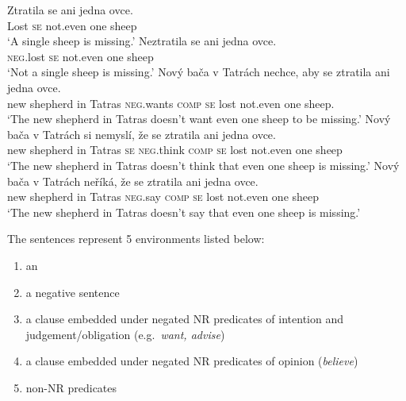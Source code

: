 \documentclass[output=paper, colorlinks, citecolor=brown, newtxmath]{langsci/langscibook}
\begin{document}
\ea \label{ex-24} \ea \gll Ztratila se ani jedna ovce.\\
Lost \textsc{se} not.even one sheep\\
\glt `A single sheep is missing.'
\ex \gll Neztratila se ani jedna ovce.\label{ex-24-b}\\
\textsc{neg}.lost \textsc{se} not.even one sheep\\
\glt `Not a single sheep is missing.'
\ex \gll Nový bača v Tatrách nechce, aby se ztratila ani jedna ovce.\\
new shepherd in Tatras \textsc{neg}.wants \textsc{comp} \textsc{se} lost not.even one sheep.\\
\glt `The new shepherd in Tatras doesn't want even one sheep to be missing.'
\ex \gll Nový bača v Tatrách si nemyslí, že se ztratila ani jedna ovce.\\
new shepherd in Tatras \textsc{se} \textsc{neg}.think \textsc{comp} \textsc{se} lost not.even one sheep\\
\glt `The new shepherd in Tatras doesn't think that even one sheep is missing.'
\ex \gll Nový bača v Tatrách neříká, že se ztratila ani jedna ovce.\\
new shepherd in Tatras \textsc{neg}.say \textsc{comp} \textsc{se} lost not.even one sheep\\
\glt `The new shepherd in Tatras doesn't say that even one sheep is missing.'
\z
\z


\noindent The sentences represent 5 environments listed below:

\begin{enumerate}
\def\labelenumi{(\Alph{enumi})}
\item
  an 
\item
  a negative sentence
\item
  a clause embedded under negated NR predicates of intention and
  judgement/obligation (e.g.~\textit{want, advise})
\item
  a clause embedded under negated NR predicates of opinion
  (\textit{believe})
\item
  non-NR predicates
\end{enumerate}
\end{document}
